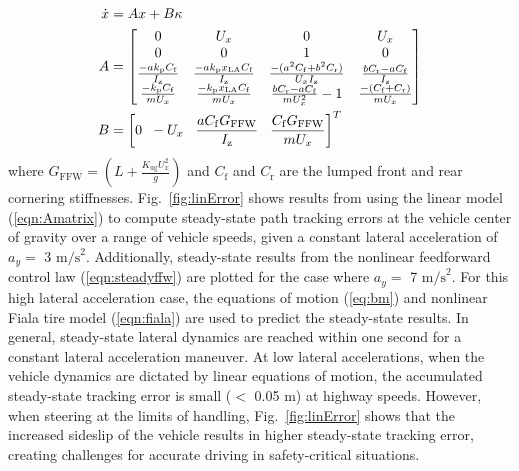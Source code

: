 \begin{subequations}
\label{eqn:Amatrix}
\begin{align}
    \dot{x} &= Ax + B\kappa  \\
	A  &=  \begin{bmatrix}
   0 & U_x & 0 & U_x \\ 
   0 & 0 & 1 & 0 \\ 
   \frac{-ak_\mathrm{p} C_\mathrm{f}}{I_\mathrm{z}}  & \frac{-ak_\mathrm{p}x_\mathrm{LA}C_\mathrm{f}}{I_\mathrm{z}}  & \frac{-(a^2C_\mathrm{f}+b^2C_\mathrm{r})}{U_xI_\mathrm{z}} & \frac{bC_\mathrm{r} - aC_\mathrm{f}}{I_\mathrm{z}}  \\
   \frac{-k_\mathrm{p}C_\mathrm{f}}{mU_x}  & \frac{-k_\mathrm{p}x_\mathrm{LA}C_\mathrm{f}}{mU_x}  & \frac{bC_\mathrm{r}-aC_\mathrm{f}}{mU_x^2}-1 & \frac{-(C_\mathrm{f} + C_\mathrm{r})}{mU_x}
  \end{bmatrix} \\
	B  &=\left[0 \hspace{2 mm} -U_x \hspace{3 mm} \frac{a C_\mathrm{f} G_\mathrm{FFW}}{I_\mathrm{z}} \hspace{3 mm}  \frac{C_\mathrm{f} G_\mathrm{FFW}}{mU_x}\right]^T
\end{align}
\end{subequations}
where $G_\mathrm{FFW} = (L+\frac{K_\mathrm{ug} U_x^2}{g})$ and $C_\mathrm{f}$ and $C_\mathrm{r}$ are the lumped front and rear cornering stiffnesses. Fig.~\ref{fig:linError} shows results from using the linear model (\ref{eqn:Amatrix}) to compute steady-state path
 tracking errors at the vehicle center of gravity over a range of vehicle speeds, given
 a constant lateral acceleration of $a_y =$ 3 $\mathrm{m/s}^2$. Additionally, steady-state results from the nonlinear feedforward control law 
 (\ref{eqn:steadyffw}) are plotted for the case where $a_y =$ 7 $\mathrm{m/s}^2$. For this high lateral acceleration case, the
 equations of motion (\ref{eq:bm}) and nonlinear Fiala tire model (\ref{eqn:fiala}) are used to predict the steady-state results. In general, steady-state lateral dynamics are reached
within one second for a constant lateral acceleration maneuver. At low lateral accelerations, when the vehicle
 dynamics are dictated by linear equations of motion, the accumulated steady-state tracking error is small ($<$ 0.05 m) at highway speeds. However, 
when steering at the limits of handling, Fig.~\ref{fig:linError} shows that the increased sideslip of the vehicle results
 in higher steady-state tracking error, creating challenges for accurate driving in safety-critical situations. 
 

